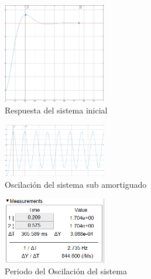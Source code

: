 \begin{figure}[h]
	\centering
	\includegraphics[width=0.4\textwidth]{media/subamortiguado-no-pid}
	\caption{Respuesta del sistema inicial}
	\label{fig:subamortiguado-no-pid}
\end{figure}

\begin{figure}[h]
	\centering
	\includegraphics[width=0.4\textwidth]{media/oscilacion_sistema}
	\caption{Oscilación del sistema sub amortiguado}
	\label{fig:oscilacionsistema}
\end{figure}

\begin{figure}[h]
	\centering
	\includegraphics[width=0.4\textwidth]{media/calculo-periodo-oscilacion}
	\caption{Periodo del Oscilación del sistema}
	\label{fig:calculo-periodo-oscilacion}
\end{figure}
